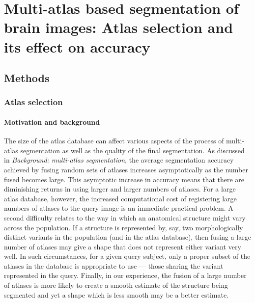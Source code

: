 
\chapter*{Multi-atlas based segmentation of brain images:
Atlas selection and its effect on accuracy}
\section*{Methods}
\subsection*{Atlas selection}
\subsubsection*{Motivation and background}
The size of the atlas database can affect
various aspects of the process of multi-atlas segmentation
as well as the quality of the final segmentation.
As discussed in \emph{Background: multi-atlas segmentation},
the average segmentation accuracy 
achieved by fusing random sets of atlases increases asymptotically
as the number fused becomes large.
This asymptotic increase in accuracy means that
there are diminishing returns in using larger and larger numbers of atlases.
For a large atlas database, however,
the increased computational cost of registering
large numbers of atlases to the query image is an immediate practical problem.
A second difficulty relates to the way
in which an anatomical structure might vary across the population.
If a structure is represented by, say,
two morphologically distinct variants in the population
(and in the atlas database),
then fusing a large number of atlases may give a shape
that does not represent either variant very well.
In such circumstances, for a given query subject,
only a proper subset of the atlases in the database is appropriate to use
— those sharing the variant represented in the query.
Finally, in our experience,
the fusion of a large number of atlases
is more likely to create a smooth estimate of the structure
being segmented and yet a shape which is less smooth may be a better estimate.

